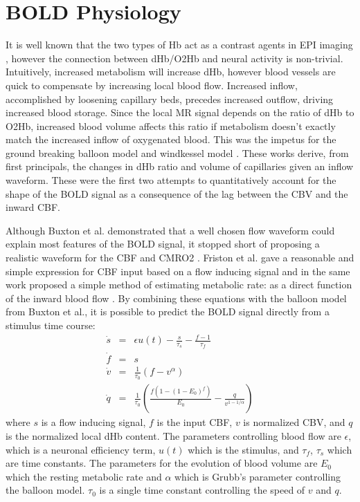 \section{\ac{BOLD} Physiology}
\label{sec:BOLD Physiology}
It is well known that the two types of \ac{Hb} act as a contrast agents in 
\ac{EPI} imaging \cite{Buxton1998, WEISSKOFF1994, Ogawa}, however the connection
between \ac{dHb}/\ac{O2Hb} and neural activity is non-trivial. 
Intuitively, increased 
metabolism will increase \ac{dHb}, however blood vessels are quick
to compensate by increasing local blood flow. Increased inflow, accomplished by loosening 
capillary beds, precedes increased outflow, driving increased 
blood storage.
Since the local \ac{MR} signal depends on the ratio of \ac{dHb} to \ac{O2Hb},
increased blood volume affects this ratio if 
metabolism doesn't exactly match the increased inflow of oxygenated blood.
This was the impetus
for the ground breaking balloon model \cite{Buxton1998} and windkessel
model \cite{Mandeville1999}. These works derive, from first principals,
the changes in \ac{dHb} ratio and volume of capillaries given an inflow waveform.
These were the first two attempts to quantitatively account for the shape of the 
\ac{BOLD} signal as a consequence of the lag between the \ac{CBV}
and the inward \ac{CBF}. 

Although Buxton et al. demonstrated that a well chosen flow waveform could 
explain most features of the \ac{BOLD} signal, it stopped short of proposing a
realistic waveform for the \ac{CBF} and \ac{CMRO2} \cite{Buxton1998}. Friston et al. 
gave a reasonable and simple
expression for \ac{CBF} input based on a flow inducing signal
and in the same work proposed a simple method
of estimating metabolic rate: as a direct function of the inward blood flow \cite{Friston2000}.
By combining these equations with the balloon model from Buxton et al.,
it is possible to predict the \ac{BOLD} signal directly from a stimulus time course:
\begin{eqnarray}
\dot{s} &=& \epsilon u(t) - \frac{s}{\tau_s} - \frac{f - 1}{\tau_f} \\
\dot{f} &=& s\\
\dot{v} &=& \frac{1}{\tau_0}(f - v^\alpha)\\
\dot{q} &=& \frac{1}{\tau_0}(\frac{f(1-(1-E_0)^f)}{E_0} - \frac{q}{v^{1-1/\alpha}})
\label{eq:bold}
\end{eqnarray}
where $s$ is a flow inducing signal, $f$ is the input \ac{CBF},
$v$ is normalized \ac{CBV}, and $q$ is the normalized
local \ac{dHb} content. The 
parameters controlling blood flow are $\epsilon$, which is a neuronal 
efficiency term, $u(t)$ which is the stimulus, and $\tau_f$, $\tau_s$ 
which are time constants. The parameters for the evolution of blood 
volume are $E_0$ which the resting metabolic
rate and $\alpha$ which is Grubb's parameter controlling the balloon model. 
$\tau_0$ is a single time constant controlling the speed of $v$ and $q$.

